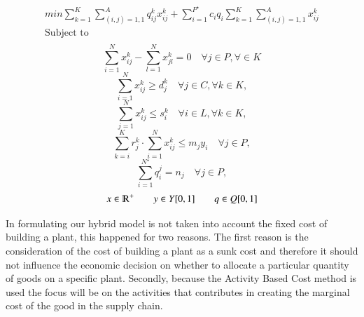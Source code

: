 \documentclass{article}
\begin{document}
\begin{equation*}
\begin{aligned}
	min \sum_{k=1}^{K} \sum_{(i,j)=1,1}^{A} q_{ij}^{k}x_{ij}^{k} + \sum_{i=1}^{P^\star} c_i q_i \sum_{k=1}^{K} \sum_{(i,j)=1,1}^{A}x_{ij}^{k} 
\\
  \text{Subject to}
\\
\end{aligned}
\end{equation*}
\begin{equation}
  \sum_{i=1}^{N} x_{ij}^k - \sum_{l=1}^{N} x_{jl}^k = 0 \quad \forall j \in P, \forall \in K
\end{equation}
\begin{equation}
  \sum_{i=1}^{N} x_{ij}^k \geq d_{j}^k \quad \forall j \in C, \forall k \in K,
\end{equation}
\begin{equation}
  \sum_{j=1}^{N} x_{ij}^{k} \leq s_{i}^{k}  \quad \forall i \in L, \forall k \in K,
\end{equation}
\begin{equation}
	\sum_{k=i}^{K} r_{j}^k \cdot \sum_{i=1}^{N}x_{ij}^k \leq m_j y_i \quad \forall j \in P,
\end{equation}
\begin{equation}
\sum_{i=1}^{N^\star} q_{i}^j = n_j \quad \forall j \in P,
\end{equation}
\begin{equation}
  x \in \varmathbb{R}^+ \quad \quad 
  y \in Y[0,1] \quad \quad  q \in Q[0,1]
\end{equation}

In formulating our hybrid model is not taken into account the fixed cost of building a plant, this happened for two reasons. The first reason is the consideration of the cost of building a plant as a sunk cost and therefore it should not influence the economic decision on whether to allocate a particular quantity of goods on a specific plant. Secondly, because the Activity Based Cost method is used the focus will be on the activities that contributes in creating the marginal cost of the good in the supply chain. 
\end{document}
